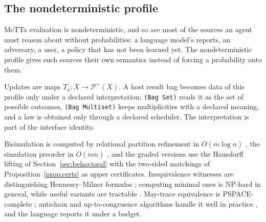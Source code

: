 \documentclass[11pt]{article}
\newcommand{\code}[1]{\texttt{#1}}
\theoremstyle{definition}
\theoremstyle{plain}
\begin{document}
\subsection{The nondeterministic profile}

MeTTa evaluation is nondeterministic, and so are most of the sources an agent must reason about
without probabilities: a language model's reports, an adversary, a user, a policy that has not been
learned yet. The nondeterministic profile gives such sources their own semantics instead of forcing
a probability onto them.

Updates are maps $T_a:X\to\mathcal P^+(X)$. A host result bag becomes data of this profile only
under a declared interpretation: \code{(Bag Set)} reads it as the set of possible outcomes,
\code{(Bag Multiset)} keeps multiplicities with a declared meaning, and a law is obtained only
through a declared scheduler. The interpretation is part of the interface identity.

Bisimulation is computed by relational partition refinement in $O(m\log n)$ \cite{paigetarjan},
the simulation preorder in $O(mn)$ \cite{hhk}, and the graded versions use the Hausdorff lifting of
Section~\ref{sec:behavioral} with the two-sided matchings of Proposition~\ref{prop:certs} as upper
certificates. Inequivalence witnesses are distinguishing Hennessy--Milner formulas
\cite{hennessymilner,cleaveland}; computing minimal ones is NP-hard in general, while useful
variants are tractable \cite{martensgroote}. May-trace equivalence is PSPACE-complete
\cite{kanellakis}; antichain and up-to-congruence algorithms handle it well in practice
\cite{antichains,bonchipous}, and the language reports it under a budget.
\end{document}
